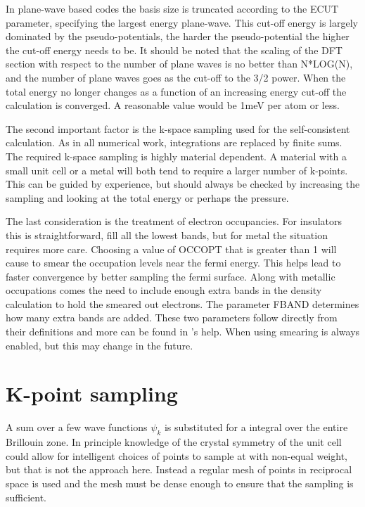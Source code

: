 \documentclass[11pt]{report}
\begin{document}
In plane-wave based codes the basis size is truncated according to the ECUT parameter, specifying the largest energy plane-wave. This cut-off energy is largely dominated by the pseudo-potentials, the harder the pseudo-potential the higher the cut-off energy needs to be. It should be noted that the scaling of the DFT section with respect to the number of plane waves is no better than N*LOG(N), and the number of plane waves goes as the cut-off to the 3/2 power. When the total energy no longer changes as a function of an increasing energy cut-off the calculation is converged. A reasonable value would be 1meV per atom or less.

The second important factor is the k-space sampling used for the self-consistent calculation. As in all numerical work, integrations are replaced by finite sums. The required k-space sampling is highly material dependent. A material with a small unit cell or a metal will both tend to require a larger number of k-points. This can be guided by experience, but should always be checked by increasing the sampling and looking at the total energy or perhaps the pressure. 

The last consideration is the treatment of electron occupancies. For insulators this is straightforward, fill all the lowest bands, but for metal the situation requires more care. Choosing a value of OCCOPT that is greater than 1 will cause  to smear the occupation levels near the fermi energy. This helps lead to faster convergence by better sampling the fermi surface. Along with metallic occupations comes the need to include enough extra bands in the density calculation to hold the smeared out electrons. The parameter FBAND determines how many extra bands are added. These two parameters follow directly from their  definitions and more can be found in 's help. When using  smearing is always enabled, but this may change in the future. 




\section{K-point sampling}

A sum over a few wave functions $\psi_k$ is substituted for a integral over the entire Brillouin zone. In principle knowledge of the crystal symmetry of the unit cell could allow for intelligent choices of  points to sample at with non-equal weight, but that is not the approach here. Instead a regular mesh of points in reciprocal space is used and the mesh must be dense enough to ensure that the sampling is sufficient. 
\end{document}
